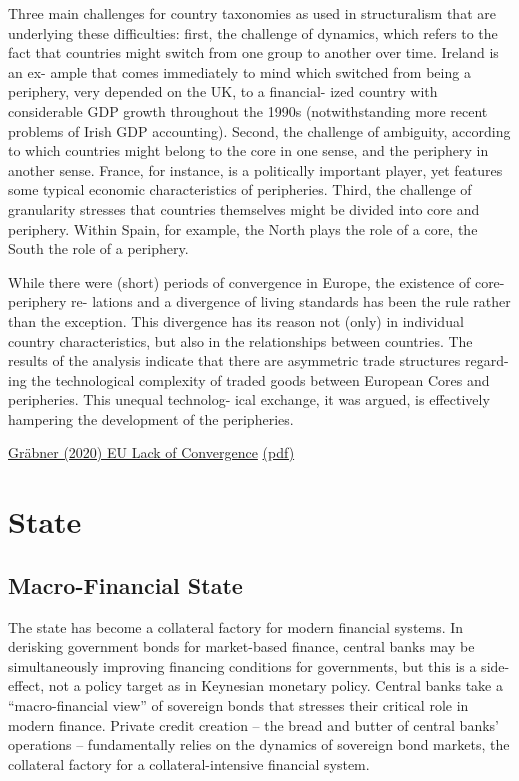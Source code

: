 \documentclass[
]{book}
\begin{document}
Three
main challenges for country taxonomies as used in structuralism
that are underlying these difficulties: first, the challenge
of dynamics, which refers to the fact that countries might
switch from one group to another over time. Ireland is an ex-
ample that comes immediately to mind which switched from
being a periphery, very depended on the UK, to a financial-
ized country with considerable GDP growth throughout the
1990s (notwithstanding more recent problems of Irish GDP
accounting). Second, the challenge of ambiguity, according
to which countries might belong to the core in one sense,
and the periphery in another sense. France, for instance,
is a politically important player, yet features some typical
economic characteristics of peripheries. Third, the challenge
of granularity stresses that countries themselves might be
divided into core and periphery. Within Spain, for example,
the North plays the role of a core, the South the role of a
periphery.

While there were (short) periods
of convergence in Europe, the existence of core-periphery re-
lations and a divergence of living standards has been the rule
rather than the exception. This divergence has its reason not
(only) in individual country characteristics, but also in the
relationships between countries. The results of the analysis
indicate that there are asymmetric trade structures regard-
ing the technological complexity of traded goods between
European Cores and peripheries. This unequal technolog-
ical exchange, it was argued, is effectively hampering the
development of the peripheries.

\href{https://www.rebuildingmacroeconomics.ac.uk/post/what-are-the-reasons-for-the-lack-of-overall-convergence-in-the-eu-a-structuralist-view}{Gräbner (2020) EU Lack of Convergence}
\href{pdf/Graeber_2020_Core_periphery_EU.pdf}{(pdf)}

\hypertarget{state}{%
\chapter{State}\label{state}}

\hypertarget{macro-financial-state}{%
\section{Macro-Financial State}\label{macro-financial-state}}

The state has become a collateral factory for modern financial
systems.
In derisking government bonds for market-based finance, central banks may be
simultaneously improving financing conditions for governments, but this is a side-effect, not
a policy target as in Keynesian monetary policy.
Central banks take a ``macro-financial view'' of sovereign bonds that stresses their critical
role in modern finance.
Private credit creation
-- the bread and butter of central banks' operations -- fundamentally relies on the dynamics
of sovereign bond markets, the collateral factory for a collateral-intensive financial system.
\end{document}
